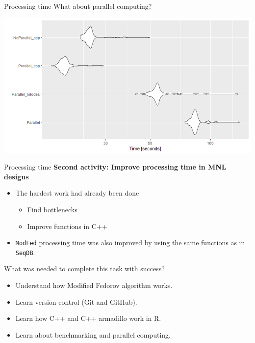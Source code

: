 \documentclass[11pt,t]{beamer}
\begin{document}
\begin{frame}[fragile]{Processing time}
	What about parallel computing?
	\vspace*{-3mm}
	\begin{center}
		\includegraphics[scale = .4]{mygraphics/benchmark3.png}
	\end{center}
\end{frame}

\begin{frame}[fragile]{Processing time}
	\textbf{Second activity: Improve processing time in MNL designs}	
	\begin{itemize}
		\item The hardest work had already been done
		\begin{itemize}
			\item Find bottlenecks
			\item Improve functions in C++
		\end{itemize}
		\item \texttt{ModFed} processing time was also improved by using the same functions as in \texttt{SeqDB}.
	\end{itemize}
	\pause
	\begin{block}{What was needed to complete this task with success?}
		\begin{itemize}
			\item Understand how Modified Fedorov algorithm works.
			\item Learn version control (Git and GitHub).
			\item Learn how C++ and C++ armadillo work in R.
			\item Learn about benchmarking and parallel computing.
		\end{itemize}
	\end{block}
\end{frame}
\end{document}
